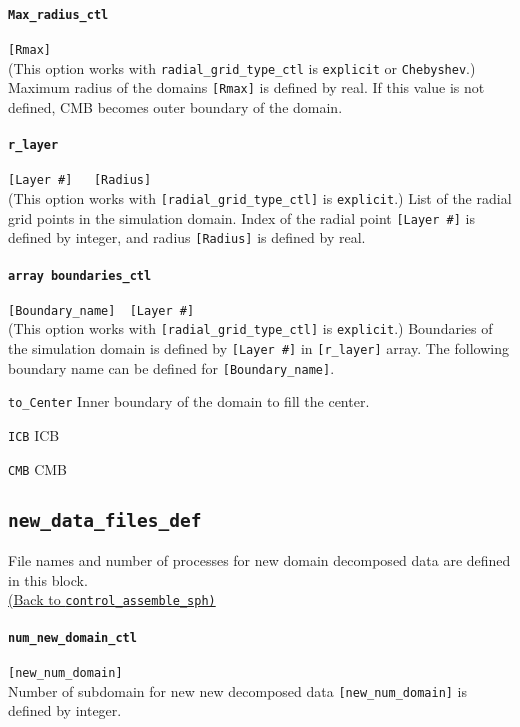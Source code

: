 \paragraph{\tt Max\_radius\_ctl }
\label{href_t:Max_radius_ctl} 
\verb|[Rmax]| \\
(This option works with \verb|radial_grid_type_ctl| is {\tt explicit} or {\tt Chebyshev}.)
Maximum radius of the domains \verb|[Rmax]| is defined by real. If this value is not defined, CMB becomes outer boundary of the domain.

\paragraph{\tt r\_layer}
\label{href_t:r_layer}
\verb|[Layer #]   [Radius]| \\
(This option works with \verb|[radial_grid_type_ctl]| is {\tt explicit}.)
List of the radial grid points in the simulation domain. Index of the radial point \verb|[Layer #]| is defined by integer, and radius \verb|[Radius]| is defined by real.

\paragraph{\tt array boundaries\_ctl}
\verb|[Boundary_name]  [Layer #]| \\
\label{href_t:boundaries_ctl} 
(This option works with \verb|[radial_grid_type_ctl]| is {\tt explicit}.)
Boundaries of the simulation domain is defined by \verb|[Layer #]| in \verb|[r_layer]| array. The following boundary name can be defined for \verb|[Boundary_name]|.
%
\begin{description}
	\item{\tt to\_Center} Inner boundary of the domain to fill the center.
	\item{\tt ICB} ICB
	\item{\tt CMB} CMB
\end{description}
%

\subsection{\tt new\_data\_files\_def}
\label{href_t:new_data_files_def}
File names and number of processes for new domain decomposed data are defined in this block. \\
\hyperref[href_i:new_data_files_def]{(Back to {\tt control\_assemble\_sph)}}

\paragraph{\tt num\_new\_domain\_ctl}
\label{href_t:num_new_domain_ctl}
\verb|[new_num_domain]| \\
Number of subdomain for new new decomposed data \verb|[new_num_domain]| is defined by integer.

